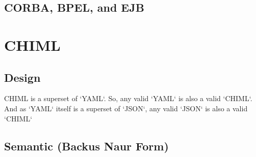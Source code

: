\documentclass[conference]{IEEEtran}
\begin{document}
\subsection{CORBA, BPEL, and EJB}

\section{CHIML}

\subsection{Design}

{\lt CHIML} is a superset of `YAML`. So, any valid `YAML` is also a valid `CHIML`. And as `YAML` itself is a superset of `JSON`, any valid `JSON` is also a valid `CHIML`

\subsection{Semantic (Backus Naur Form)}
\end{document}
